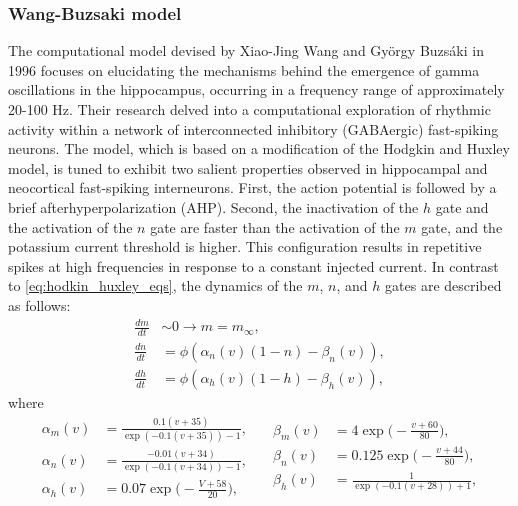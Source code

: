 \documentclass[../main.tex]{subfiles}
\begin{document}
\subsubsection{Wang-Buzsaki model}
The computational model devised by Xiao-Jing Wang and György Buzsáki in 1996 \citep{Wang1996} focuses on elucidating the mechanisms behind the emergence of gamma oscillations in the hippocampus, occurring in a frequency range of approximately 20-100 Hz.
Their research \citep{Wang1996} delved into a computational exploration of rhythmic activity within a network of interconnected inhibitory (GABAergic) fast-spiking neurons. %
The model, which is based on a modification of the Hodgkin and Huxley model, is tuned to exhibit two salient properties observed in hippocampal and neocortical fast-spiking interneurons.
First, the action potential is followed by a brief afterhyperpolarization (AHP).
Second, the inactivation of the $h$ gate and the activation of the $n$ gate are faster than the activation of the $m$ gate, and the potassium current threshold is higher.
This configuration results in repetitive spikes at high frequencies in response to a constant injected current.
In contrast to \eqref{eq:hodkin_huxley_eqs}, the dynamics of the $m$, $n$, and $h$ gates are described as follows:
\begin{equation}
    \begin{aligned}
            \displaystyle\frac{dm}{dt} & \sim 0 \rightarrow m = m_{\infty},\\
            \displaystyle\frac{dn}{dt} &= \phi(\alpha_n(v)(1-n)-\beta_n(v)),\\
            \displaystyle\frac{dh}{dt} &= \phi(\alpha_h(v)(1-h)-\beta_h(v)),
        \end{aligned}
        \label{eq:wang-buzsaki}
\end{equation}
where
\begin{equation}
    \begin{split}
        \alpha_m(v) & = \displaystyle\frac{0.1(v+35)}{\exp(-0.1(v+35))-1},\\
        \alpha_n(v) & = \displaystyle\frac{-0.01(v+34)}{\exp(-0.1(v+34))-1},\\
        \alpha_h(v) & = 0.07\exp\bigg(-\frac{V+58}{20}\bigg), \\
    \end{split}\quad
    \begin{split}
        \beta_m(v) & = 4\exp\bigg(-\frac{v+60}{80}\bigg), \\
        \beta_n(v)  & = 0.125\exp\bigg(-\frac{v+44}{80}\bigg),\\
        \beta_h(v) & = \displaystyle\frac{1}{\exp(-0.1(v+28))+1}, \\
    \end{split}
\end{equation}
\end{document}
